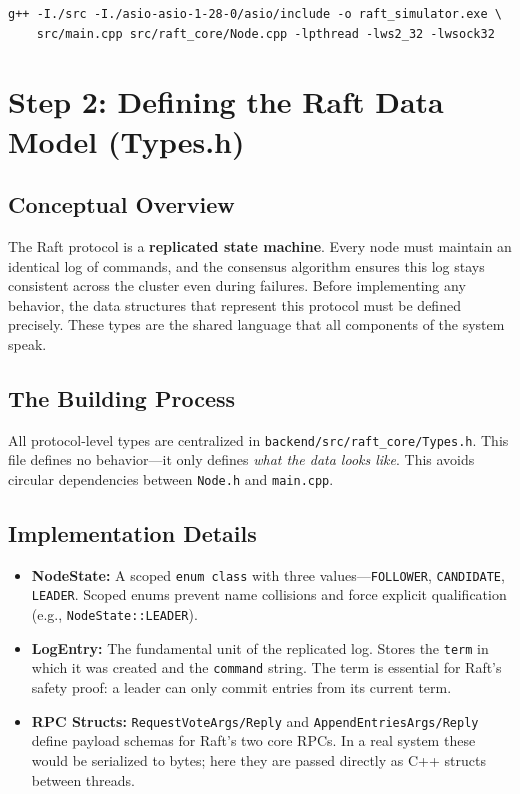 \documentclass[11pt, a4paper]{article}
\begin{document}
\begin{lstlisting}[style=bashstyle, caption={Direct g++ compilation (Windows)}]
g++ -I./src -I./asio-asio-1-28-0/asio/include -o raft_simulator.exe \
    src/main.cpp src/raft_core/Node.cpp -lpthread -lws2_32 -lwsock32
\end{lstlisting}

\newpage

\section{Step 2: Defining the Raft Data Model (Types.h)}

\subsection{Conceptual Overview}
The Raft protocol is a \textbf{replicated state machine}. Every node must
maintain an identical log of commands, and the consensus algorithm ensures
this log stays consistent across the cluster even during failures. Before
implementing any behavior, the data structures that represent this protocol
must be defined precisely. These types are the shared language that all
components of the system speak.

\subsection{The Building Process}
All protocol-level types are centralized in
\texttt{backend/src/raft\_core/Types.h}. This file defines no behavior---it
only defines \textit{what the data looks like}. This avoids circular
dependencies between \texttt{Node.h} and \texttt{main.cpp}.

\subsection{Implementation Details}
\begin{itemize}[leftmargin=*]
    \item \textbf{NodeState:} A scoped \texttt{enum class} with three
          values---\texttt{FOLLOWER}, \texttt{CANDIDATE}, \texttt{LEADER}.
          Scoped enums prevent name collisions and force explicit
          qualification (e.g., \texttt{NodeState::LEADER}).
    \item \textbf{LogEntry:} The fundamental unit of the replicated log.
          Stores the \texttt{term} in which it was created and the
          \texttt{command} string. The term is essential for Raft's safety
          proof: a leader can only commit entries from its current term.
    \item \textbf{RPC Structs:} \texttt{RequestVoteArgs/Reply} and
          \texttt{AppendEntriesArgs/Reply} define payload schemas for Raft's
          two core RPCs. In a real system these would be serialized to bytes;
          here they are passed directly as C++ structs between threads.
\end{itemize}
\end{document}
